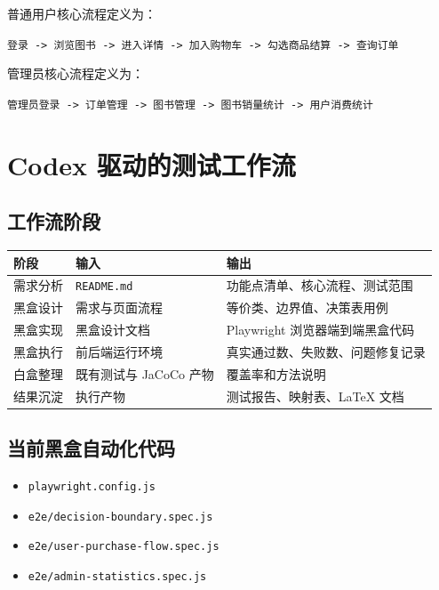 \documentclass[UTF8,a4paper,12pt]{ctexart}
\begin{document}
普通用户核心流程定义为：

\begin{center}
\texttt{登录 -> 浏览图书 -> 进入详情 -> 加入购物车 -> 勾选商品结算 -> 查询订单}
\end{center}

管理员核心流程定义为：

\begin{center}
\texttt{管理员登录 -> 订单管理 -> 图书管理 -> 图书销量统计 -> 用户消费统计}
\end{center}

\section{Codex 驱动的测试工作流}

\subsection{工作流阶段}

\begin{longtable}{p{2cm}p{5cm}p{7cm}}
\toprule
阶段 & 输入 & 输出 \\
\midrule
需求分析 & \texttt{README.md} & 功能点清单、核心流程、测试范围 \\
黑盒设计 & 需求与页面流程 & 等价类、边界值、决策表用例 \\
黑盒实现 & 黑盒设计文档 & Playwright 浏览器端到端黑盒代码 \\
黑盒执行 & 前后端运行环境 & 真实通过数、失败数、问题修复记录 \\
白盒整理 & 既有测试与 JaCoCo 产物 & 覆盖率和方法说明 \\
结果沉淀 & 执行产物 & 测试报告、映射表、LaTeX 文档 \\
\bottomrule
\end{longtable}

\subsection{当前黑盒自动化代码}

\begin{itemize}
  \item \texttt{playwright.config.js}
  \item \texttt{e2e/decision-boundary.spec.js}
  \item \texttt{e2e/user-purchase-flow.spec.js}
  \item \texttt{e2e/admin-statistics.spec.js}
\end{itemize}
\end{document}
